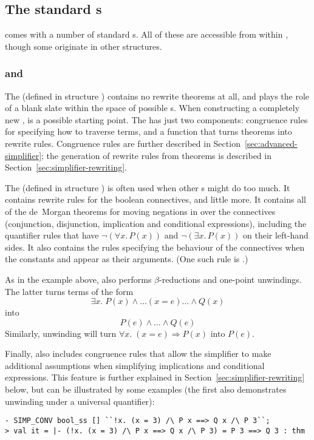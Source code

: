 {\subsection{The standard \simpset{}s}
\label{sec:standard-simpsets}

\HOL{} comes with a number of standard \simpset{}s.  All of these are
accessible from within , though some originate in other
structures.

\subsubsection{ and }
\label{sec:purebool-ss}
%
%
The  \simpset{} (defined in structure )
contains no rewrite theorems at all, and plays the role of a blank
slate within the space of possible \simpset{}s.  When constructing a
completely new \simpset,  is a possible starting point.
The  \simpset{} has just two components: congruence rules
for specifying how to traverse terms, and a function that turns
theorems into rewrite rules.  Congruence rules are further described
in Section~\ref{sec:advanced-simplifier}; the generation of rewrite
rules from theorems is described in
Section~\ref{sec:simplifier-rewriting}.

%
The  \simpset{} (defined in structure ) is
often used when other \simpset{}s might do too much.  It contains
rewrite rules for the boolean connectives, and little more.  It
contains all of the de~Morgan theorems for moving negations in over
the connectives (conjunction, disjunction, implication and conditional
expressions), including the quantifier rules that have $\neg(\forall
x.\,P(x))$ and $\neg(\exists x.\,P (x))$ on their left-hand sides.  It
also contains the rules specifying the behaviour of the connectives
when the constants  and  appear as their
arguments.  (One such rule is .)

As in the example above,  also performs
$\beta$-reductions and one-point unwindings.  The latter turns terms
of the form \[
\exists x.\;P(x)\land\dots (x = e) \dots\land Q(x)
\]
into
\[
P(e) \land \dots \land Q(e)
\]
Similarly, unwinding will turn $\forall x.\;(x = e)
\Rightarrow P(x)$ into $P(e)$.

Finally,  also includes congruence rules that allow
the simplifier to make additional assumptions when simplifying
implications and conditional expressions.  This feature is further
explained in Section~\ref{sec:simplifier-rewriting} below, but can be
illustrated by some examples (the first also demonstrates unwinding
under a universal quantifier):
\begin{session}
\begin{hol}
\begin{verbatim}
- SIMP_CONV bool_ss [] ``!x. (x = 3) /\ P x ==> Q x /\ P 3``;
> val it = |- (!x. (x = 3) /\ P x ==> Q x /\ P 3) = P 3 ==> Q 3 : thm


\end{verbatim}
\end{hol}
\end{session}}
